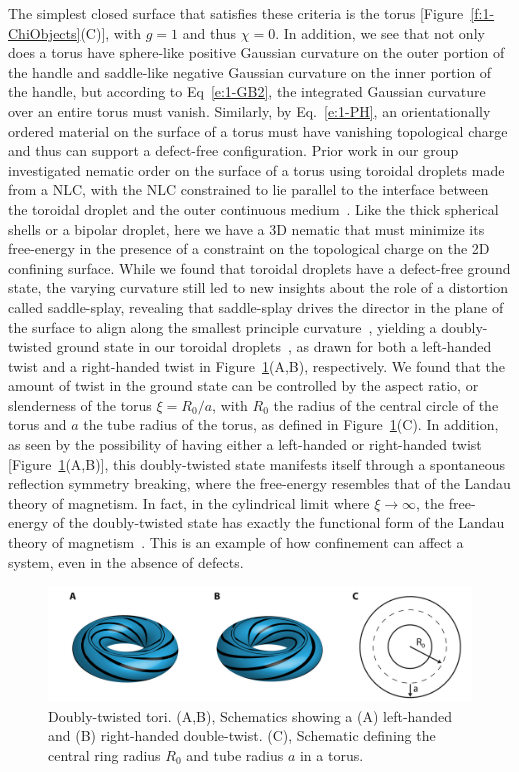 The simplest closed surface that satisfies these criteria is the torus [Figure~\ref{f:1-ChiObjects}(C)], with $g = 1$ and thus $\chi = 0$.
In addition, we see that not only does a torus have sphere-like positive Gaussian curvature on the outer portion of the handle and saddle-like negative Gaussian curvature on the inner portion of the handle, but according to Eq~\ref{e:1-GB2}, the integrated Gaussian curvature over an entire torus must vanish.
Similarly, by Eq.~\ref{e:1-PH}, an orientationally ordered material on the surface of a torus must have vanishing topological charge and thus can support a defect-free configuration.
Prior work in our group investigated nematic order on the surface of a torus using toroidal droplets made from a NLC, with the NLC constrained to lie parallel to the interface between the toroidal droplet and the outer continuous medium~\cite{RN46,RN47}.
Like the thick spherical shells or a bipolar droplet, here we have a 3D nematic that must minimize its free-energy in the presence of a constraint on the topological charge on the 2D confining surface.
While we found that toroidal droplets have a defect-free ground state, the varying curvature still led to new insights about the role of a distortion called saddle-splay, revealing that saddle-splay drives the director in the plane of the surface to align along the smallest principle curvature~\cite{RN59}, yielding a doubly-twisted ground state in our toroidal droplets~\cite{RN46}, as drawn for both a left-handed twist and a right-handed twist in Figure~\ref{f:1-Torus}(A,B), respectively.
We found that the amount of twist in the ground state can be controlled by the aspect ratio, or slenderness of the torus $\xi = R_0/a$, with $R_0$ the radius of the central circle of the torus and $a$ the tube radius of the torus, as defined in Figure~\ref{f:1-Torus}(C).
In addition, as seen by the possibility of having either a left-handed or right-handed twist [Figure~\ref{f:1-Torus}(A,B)], this doubly-twisted state manifests itself through a spontaneous reflection symmetry breaking, where the free-energy resembles that of the Landau theory of magnetism.
In fact, in the cylindrical limit where $\xi \rightarrow \infty$, the free-energy of the doubly-twisted state has exactly the functional form of the Landau theory of magnetism~\cite{RN191}.
This is an example of how confinement can affect a system, even in the absence of defects.
\begin{figure}
  \centering
  \includegraphics{figures/C1/Ch1-Figs_Torus.png}
  \caption{Doubly-twisted tori.
  (A,B), Schematics showing a (A) left-handed and (B) right-handed double-twist.
  (C), Schematic defining the central ring radius $R_0$ and tube radius $a$ in a torus.}\label{f:1-Torus}
\end{figure}

